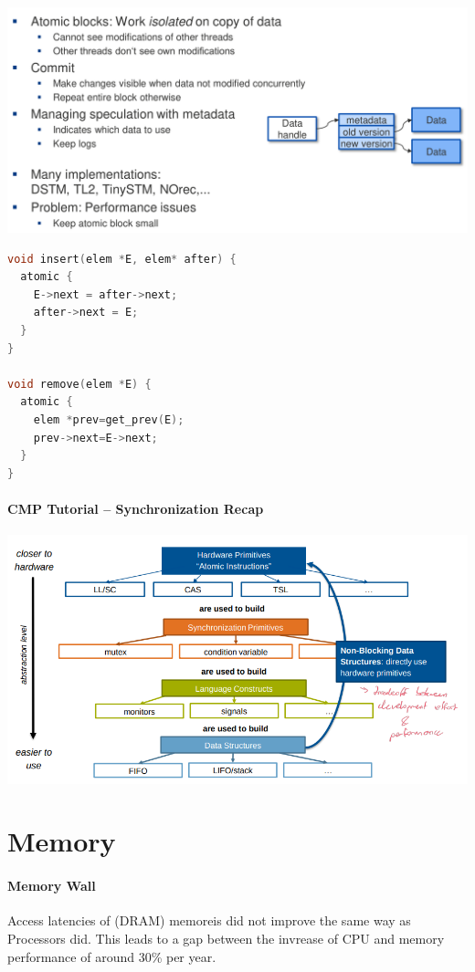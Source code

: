 \documentclass[fontsize=8pt]{scrartcl}
\begin{document}
\begin{multicols*}{4}
\begin{center}
  \centering
  \includegraphics[width=0.8\linewidth]{img/SoftwareTransMemory.png}
  \label{fig:softwaretransmemory}
\end{center}

\begin{lstlisting}[language=c, numbers=none]
void insert(elem *E, elem* after) {
  atomic {
    E->next = after->next;
    after->next = E;
  }
}

void remove(elem *E) {
  atomic {
    elem *prev=get_prev(E);
    prev->next=E->next;
  }
}
\end{lstlisting} %

\paragraph{CMP Tutorial – Synchronization Recap}

\begin{center}
  \centering
  \includegraphics[width=0.8\linewidth]{img/SynchronizationRecap.png}
  \label{fig:synchronizationrecap}
\end{center}


\section{Memory}

\paragraph{Memory Wall} Access latencies of (DRAM) memoreis did not improve the same way as Processors did. This leads to a gap between the invrease of CPU and memory performance of around 30\% per year.


\end{multicols*}
\end{document}
